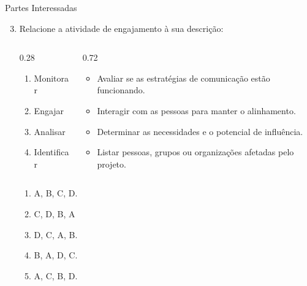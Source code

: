 \documentclass{beamer}
\begin{document}
\begin{frame}{Partes Interessadas}
	\begin{enumerate}
		\setcounter{enumi}{2}
		\justifying
		\item Relacione a atividade de engajamento à sua descrição:
		\begin{columns}
			\begin{column}{0.28\textwidth}
				\begin{enumerate}[A]
					\item Monitorar
					\item Engajar
					\item Analisar
					\item Identificar
				\end{enumerate}
			\end{column}
			\begin{column}{0.72\textwidth}
				\begin{itemize}
					\item Avaliar se as estratégias de comunicação estão funcionando.
					\item Interagir com as pessoas para manter o alinhamento.
					\item Determinar as necessidades e o potencial de influência.
					\item Listar pessoas, grupos ou organizações afetadas pelo projeto.
				\end{itemize}
			\end{column}
		\end{columns}
		\begin{enumerate}[a]
			\item A, B, C, D.
			\item \alert<2>{C, D, B, A}
			\item D, C, A, B.
			\item B, A, D, C.
			\item A, C, B, D.
		\end{enumerate}
	\end{enumerate}
\end{frame}
\end{document}

